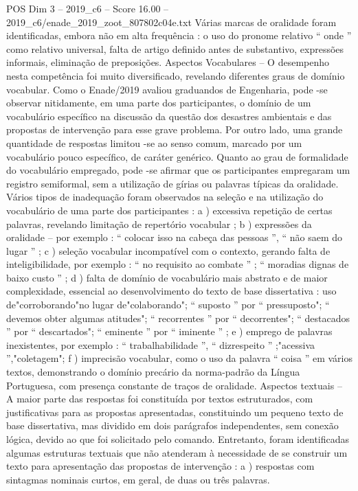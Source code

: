 \begin{textsample}{POS Dim 3 – 2019\_c6 – Score 16.00 – 2019\_c6/enade\_2019\_zoot\_807802c04e.txt}
Várias marcas de oralidade foram identificadas, embora não em alta frequência : o uso do pronome relativo “ onde ” como relativo universal, falta de artigo definido antes de substantivo, expressões informais, eliminação de preposições.
Aspectos Vocabulares – O desempenho nesta competência foi muito diversificado, revelando diferentes graus de domínio vocabular.
Como o Enade/2019 avaliou graduandos de Engenharia, pode -se observar nitidamente, em uma parte dos participantes, o domínio de um vocabulário específico na discussão da questão dos desastres ambientais e das propostas de intervenção para esse grave problema.
Por outro lado, uma grande quantidade de respostas limitou -se ao senso comum, marcado por um vocabulário pouco específico, de caráter genérico.
Quanto ao grau de formalidade do vocabulário empregado, pode -se afirmar que os participantes empregaram um registro semiformal, sem a utilização de gírias ou palavras típicas da oralidade.
Vários tipos de inadequação foram observados na seleção e na utilização do vocabulário de uma parte dos participantes : a ) excessiva repetição de certas palavras, revelando limitação de repertório vocabular ; b ) expressões da oralidade – por exemplo : “ colocar isso na cabeça das pessoas ”, “ não saem do lugar ” ; c ) seleção vocabular incompatível com o contexto, gerando falta de inteligibilidade, por exemplo : “ no requisito ao combate ” ; “ moradias dignas de baixo custo ” ; d ) falta de domínio de vocabulário mais abstrato e de maior complexidade, essencial ao desenvolvimento do texto de base dissertativa : uso de"corroborando"no lugar de"colaborando"; “ suposto ” por “ pressuposto"; “ devemos obter algumas atitudes"; “ recorrentes ” por “ decorrentes"; “ destacados ” por “ descartados"; “ eminente ” por “ iminente ” ; e ) emprego de palavras inexistentes, por exemplo : “ trabalhabilidade ”, “ dizrespeito ” ;"acessiva ”,"coletagem"; f ) imprecisão vocabular, como o uso da palavra “ coisa ” em vários textos, demonstrando o domínio precário da norma-padrão da Língua Portuguesa, com presença constante de traços de oralidade.
Aspectos textuais – A maior parte das respostas foi constituída por textos estruturados, com justificativas para as propostas apresentadas, constituindo um pequeno texto de base dissertativa, mas dividido em dois parágrafos independentes, sem conexão lógica, devido ao que foi solicitado pelo comando.
Entretanto, foram identificadas algumas estruturas textuais que não atenderam à necessidade de se construir um texto para apresentação das propostas de intervenção : a ) respostas com sintagmas nominais curtos, em geral, de duas ou três palavras.

\end{textsample}
